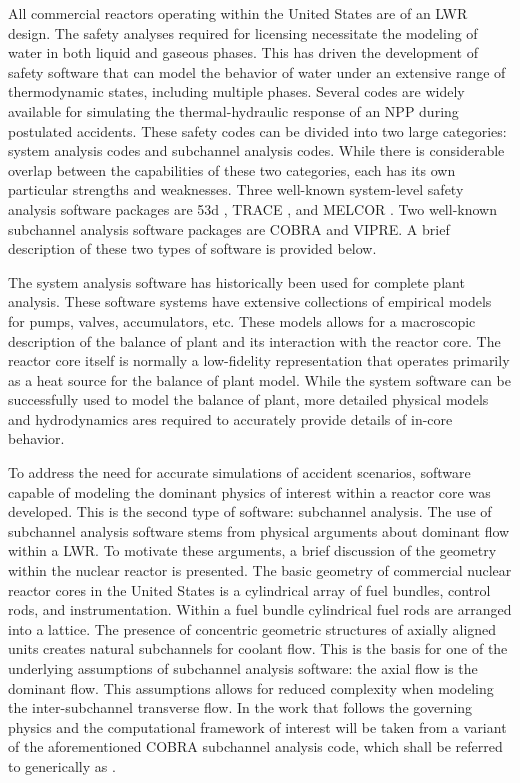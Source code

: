 All commercial reactors operating within the United States are of an LWR design.
The safety analyses required for licensing necessitate the modeling of water in both liquid and gaseous phases.
This has driven the development of safety software that can model the behavior of water under an extensive range of thermodynamic states, including multiple phases.
Several codes are widely available for simulating the thermal-hydraulic response of an NPP during postulated accidents.
These safety codes can be divided into two large categories: system analysis codes and subchannel analysis codes.
While there is considerable overlap between the capabilities of these two categories, each has its own particular strengths and weaknesses.
Three well-known system-level safety analysis software packages are \relap53d{} \cite{RELAP}, TRACE \cite{TRACE}, and MELCOR \cite{Summers1994}.
Two well-known subchannel analysis software packages are COBRA \cite{Thurgood1983c} and VIPRE.
A brief description of these two types of software is provided below.

The system analysis software has historically been used for complete plant analysis.
These software systems have extensive collections of empirical models for pumps, valves, accumulators, etc.
These models allows for a macroscopic description of the balance of plant and its interaction with the
reactor core.
The reactor core itself is normally a low-fidelity representation that operates primarily as a heat source for the balance of plant model.
While the system software can be successfully used to model the balance of plant, more detailed physical models and hydrodynamics ares required to accurately provide details of in-core behavior.

To address the need for accurate simulations of accident scenarios, software capable of modeling the dominant physics of interest within a reactor core was developed.
This is the second type of software: subchannel analysis.
The use of subchannel analysis software stems from physical arguments about dominant flow within a LWR.
To motivate these arguments, a brief discussion of the geometry within the nuclear reactor is presented.
The basic geometry of commercial nuclear reactor cores in the United States is a cylindrical array of fuel bundles, control rods, and instrumentation.
Within a fuel bundle cylindrical fuel rods are arranged into a lattice.
The presence of concentric geometric structures of axially aligned units creates natural subchannels for coolant flow.
This is the basis for one of the underlying assumptions of subchannel analysis software: the axial flow is the dominant flow.
This assumptions allows for reduced complexity when modeling the inter-subchannel transverse flow.
In the work that follows the governing physics and the computational framework of interest will be taken from a variant of the aforementioned COBRA subchannel analysis code, which shall be referred to generically as \cobra{}.

